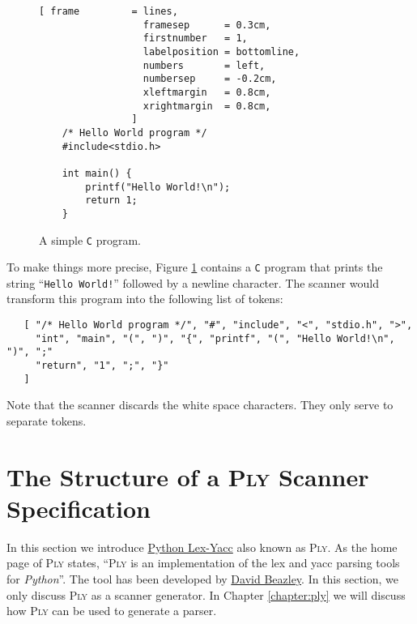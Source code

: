 \begin{figure}[!ht]
\centering
\begin{Verbatim}[ frame         = lines, 
                  framesep      = 0.3cm, 
                  firstnumber   = 1,
                  labelposition = bottomline,
                  numbers       = left,
                  numbersep     = -0.2cm,
                  xleftmargin   = 0.8cm,
                  xrightmargin  = 0.8cm,
                ]
    /* Hello World program */
    #include<stdio.h>
    
    int main() {
        printf("Hello World!\n");
        return 1;
    }
\end{Verbatim}
\vspace*{-0.3cm}
\caption{A simple \texttt{C} program.}
\label{fig:hello-world.c}
\end{figure}

To make things more precise, Figure \ref{fig:hello-world.c} contains a \texttt{C} program that
prints the string ``\texttt{Hello World!}'' followed by a newline character.  The scanner would
transform this program into the following list of tokens:
\begin{verbatim}
   [ "/* Hello World program */", "#", "include", "<", "stdio.h", ">",
     "int", "main", "(", ")", "{", "printf", "(", "Hello World!\n", ")", ";"
     "return", "1", ";", "}"
   ]
\end{verbatim}
Note that the scanner discards the white space characters.  They only serve to separate tokens.


\section{The Structure of a \textsc{Ply} Scanner Specification}
In this section we introduce \href{https://www.dabeaz.com/ply/}{Python Lex-Yacc} also known as \textsc{Ply}.
As the home page of \textsc{Ply} states, ``\textsc{Ply} is an implementation of the lex and yacc parsing tools
for \textsl{Python}''.  The tool has been developed by \href{https://www.dabeaz.com/}{David Beazley}.  In this
section, we only discuss \textsc{Ply} as a scanner generator.  In Chapter \ref{chapter:ply} we will discuss how
\textsc{Ply}  can be used to generate a parser.

